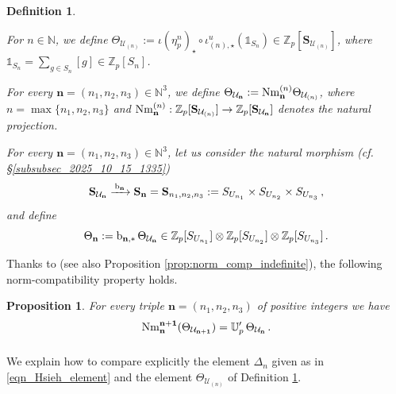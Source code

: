 \documentclass{amsart}
\numberwithin{equation}{section}
\newtheorem{proposition}[theorem]{Proposition}
\newtheorem{defn}[theorem]{Definition}
\newcommand{\Zp}{\mathbb{Z}_p}
\begin{document}
\begin{defn}\label{def_2025_10_14_1506}
    \item[i)] For $n \in \mathbb N$, we define $\Theta_{\mathcal{U}_{(n)}} := \iota(\eta^n_p)_\star \circ  \iota^u_{(n),\star}(\mathbb{1}_{S_n}) \in  \Zp[\mathbf{S}_{\mathcal{U}_{(n)}}]$, where $\mathbb{1}_{S_n} = \sum_{g \in S_n} [g] \in \Zp[S_n]$.        
    \item[ii)]    For every ${\mathbf{n} } = (n_1,n_2,n_3) \in \mathbb N^3$, we define $\Theta_{\mathcal{U}_{\mathbf{n}}} : = {\rm Nm}^{(n)}_{\mathbf{n}} \Theta_{\mathcal{U}_{(n)}} $, where $n = \max \{ n_1,n_2,n_3 \}$ and ${\rm Nm}^{(n)}_{\mathbf{n}} : \Zp[\mathbf{S}_{\mathcal{U}_{(n)}}] \to \Zp[\mathbf{S}_{\mathcal{U}_{\mathbf{n}}}]$ denotes the natural projection.
    \item[iii)] For every ${\mathbf{n} } = (n_1,n_2,n_3) \in \mathbb N^3$, let us consider the natural morphism (cf. \S\ref{subsubsec_2025_10_15_1335}) 
$$\mathbf{S}_{\mathcal{U}_{\mathbf{n}}}  \xrightarrow{\,{\rm b}_{\mathbf{n}}\,} \mathbf{S}_{\mathbf{n}}=\mathbf{S}_{n_1,n_2,n_3} := S_{U_{n_1}} \times S_{U_{n_2}} \times S_{U_{n_3}}\,,$$ 
and define 
\begin{equation}
\label{eqn_2025_10_29_0931}
    \Theta_{\mathbf{n}}:={\rm b}_{\mathbf{n},*}\,\Theta_{\mathcal{U}_{\mathbf{n}}}\in \Zp[S_{U_{n_1}}]\otimes\Zp[S_{U_{n_2}}]\otimes\Zp[S_{U_{n_3}}] \,.
\end{equation}
\end{defn}

Thanks to \cite[Prop. 4.5.2]{LoefflerSpherical} (see also Proposition \ref{prop:norm_comp_indefinite}), the following norm-compatibility property holds.

\begin{proposition}
 For every triple ${\mathbf{n} } = (n_1, n_2, n_3)$ of positive integers %
 we have 
 \[ {\rm Nm}^{\mathbf{n}+\mathbf{1}}_{\mathbf{n}}(\Theta_{\mathcal{U}_{\mathbf{n+1}}}) = \mathbb{U}_p' \, \Theta_{\mathcal{U}_{\mathbf{n}}}\,.\] 
\end{proposition}




\subsubsection{} We explain how to compare explicitly the element $\Delta_n$ given as in \eqref{eqn_Hsieh_element} and the element $\Theta_{\mathcal{U}_{(n)}}$ of Definition \ref{def_2025_10_14_1506}.
\end{document}
